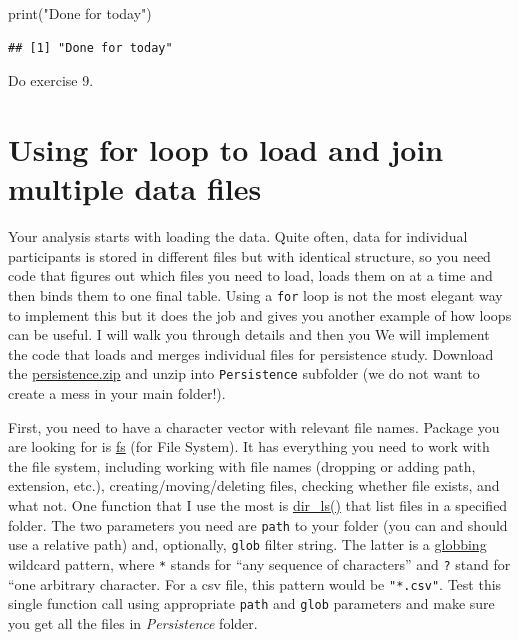 \documentclass[
]{book}
\newenvironment{Shaded}{\begin{snugshade}}{\end{snugshade}}
\newcommand{\FunctionTok}[1]{\textcolor[rgb]{0.00,0.00,0.00}{#1}}
\newcommand{\NormalTok}[1]{#1}
\newcommand{\StringTok}[1]{\textcolor[rgb]{0.31,0.60,0.02}{#1}}
\begin{document}
\begin{Shaded}
\begin{Highlighting}[]
\FunctionTok{print}\NormalTok{(}\StringTok{"Done for today"}\NormalTok{)}
\end{Highlighting}
\end{Shaded}

\begin{verbatim}
## [1] "Done for today"
\end{verbatim}

Do exercise 9.

\hypertarget{using-for-loop-to-load-and-join-multiple-data-files}{%
\section{Using for loop to load and join multiple data files}\label{using-for-loop-to-load-and-join-multiple-data-files}}

Your analysis starts with loading the data. Quite often, data for individual participants is stored in different files but with identical structure, so you need code that figures out which files you need to load, loads them on at a time and then binds them to one final table. Using a \texttt{for} loop is not the most elegant way to implement this but it does the job and gives you another example of how loops can be useful. I will walk you through details and then you We will implement the code that loads and merges individual files for persistence study. Download the \href{data/persistence.zip}{persistence.zip} and unzip into \texttt{Persistence} subfolder (we do not want to create a mess in your main folder!).

First, you need to have a character vector with relevant file names. Package you are looking for is \href{https://github.com/r-lib/fs}{fs} (for File System). It has everything you need to work with the file system, including working with file names (dropping or adding path, extension, etc.), creating/moving/deleting files, checking whether file exists, and what not. One function that I use the most is \href{https://www.rdocumentation.org/packages/fs/versions/1.5.0/topics/dir_ls}{dir\_ls()} that list files in a specified folder. The two parameters you need are \texttt{path} to your folder (you can and should use a relative path) and, optionally, \texttt{glob} filter string. The latter is a \href{https://en.wikipedia.org/wiki/Glob_(programming)}{globbing} wildcard pattern, where \texttt{*} stands for ``any sequence of characters'' and \texttt{?} stand for ``one arbitrary character. For a csv file, this pattern would be \texttt{"*.csv"}. Test this single function call using appropriate \texttt{path} and \texttt{glob} parameters and make sure you get all the files in \emph{Persistence} folder.
\end{document}
